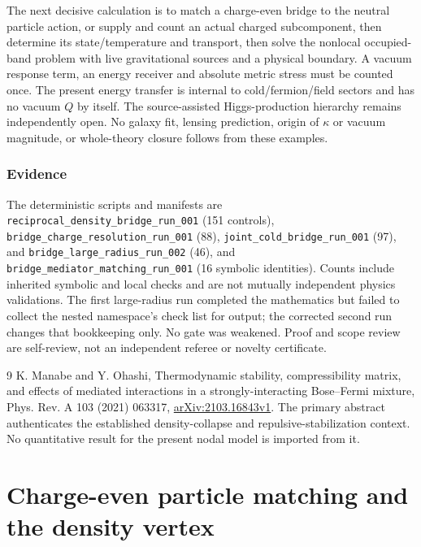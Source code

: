 \documentclass[11pt]{article}
\begin{document}
The next decisive calculation is to match a charge-even bridge to the
neutral particle action, or supply and count an actual charged subcomponent,
then determine its state/temperature and transport,
then solve the nonlocal occupied-band problem with live gravitational
sources and a physical boundary. A vacuum response term, an energy receiver
and absolute metric stress must be counted once. The present energy transfer
is internal to cold/fermion/field sectors and has no vacuum $Q$ by itself.
The source-assisted Higgs-production hierarchy remains independently open.
No galaxy fit, lensing prediction, origin of $\kappa$ or vacuum magnitude,
or whole-theory closure follows from these examples.

\section{Evidence}
The deterministic scripts and manifests are
\texttt{reciprocal\_density\_bridge\_run\_001} (151 controls),
\texttt{bridge\_charge\_resolution\_run\_001} (88),
\texttt{joint\_cold\_bridge\_run\_001} (97), and
\texttt{bridge\_large\_radius\_run\_002} (46), and
\texttt{bridge\_mediator\_matching\_run\_001} (16 symbolic identities).
Counts include inherited symbolic and local checks and are not mutually
independent physics validations. The first large-radius run completed the
mathematics but failed to collect the nested namespace's check list for
output; the corrected second run changes that bookkeeping only. No gate
was weakened. Proof and scope review are self-review, not an independent
referee or novelty certificate.

\begin{thebibliography}{9}
 K. Manabe and Y. Ohashi,
Thermodynamic stability, compressibility matrix, and effects of mediated
interactions in a strongly-interacting Bose--Fermi mixture,
Phys. Rev. A 103 (2021) 063317,
\href{https://arxiv.org/abs/2103.16843v1}{arXiv:2103.16843v1}.
The primary abstract authenticates the established density-collapse and
repulsive-stabilization context. No quantitative result for the present
nodal model is imported from it.
\end{thebibliography}

\clearpage

\part{Charge-even particle matching and the density vertex}
\end{document}
